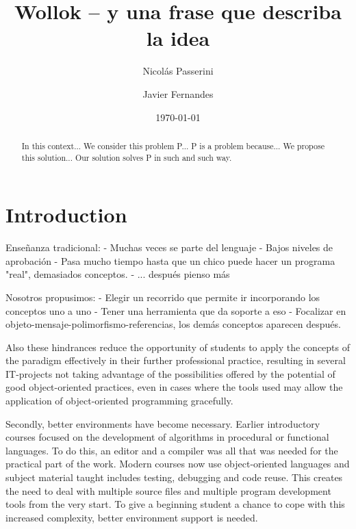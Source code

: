 \documentclass{article}
\begin{document}
\title{Wollok -- y una frase que describa la idea}
\author{Nicolás Passerini \and Javier Fernandes}
\date{\today}
\maketitle

\begin{abstract}
In this context...
We consider this problem P...
P is a problem because...
We propose this solution...
Our solution solves P in such and such way.
\end{abstract}


\section{Introduction}
\label{sec:intro}


Enseñanza tradicional:
- Muchas veces se parte del lenguaje
- Bajos niveles de aprobación
- Pasa mucho tiempo hasta que un chico puede hacer un programa "real", demasiados conceptos.
- ... después pienso más

Nosotros propusimos:
- Elegir un recorrido que permite ir incorporando los conceptos uno a uno
- Tener una herramienta que da soporte a eso
- Focalizar en objeto-mensaje-polimorfismo-referencias, los demás conceptos aparecen después.


Also these hindrances reduce the opportunity of students to apply
the concepts of the paradigm effectively in their further
professional practice, resulting in several IT-projects not taking
advantage of the possibilities offered by the potential of good
object-oriented practices, even in cases where the tools used may
allow the application of object-oriented programming gracefully. \cite{lombardi_instances_2007}

Secondly, better environments have become necessary. Earlier introductory courses
focused on the development of algorithms in procedural or functional languages. To
do this, an editor and a compiler was all that was needed for the practical part of the
work. Modern courses now use object-oriented languages and subject material
taught includes testing, debugging and code reuse. This creates the need to deal with
multiple source files and multiple program development tools from the very start. To
give a beginning student a chance to cope with this increased complexity, better
environment support is needed. \cite{kolling_problem_1999}
\end{document}
